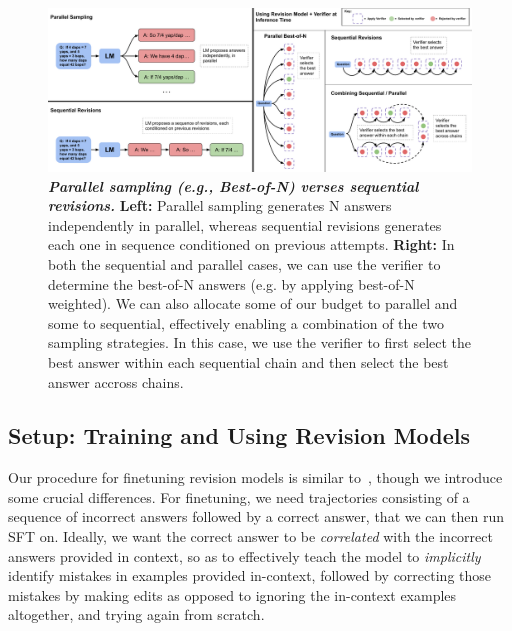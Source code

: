 \begin{figure}
    \centering
    \includegraphics[width=0.99\linewidth]{figures/Revisions_descriptive_fig.pdf}
    \vspace{-0.3cm}
    \caption{\footnotesize{\textbf{\emph{Parallel sampling (e.g., Best-of-N) verses sequential revisions.}} \textbf{Left:} Parallel sampling generates N answers independently in parallel, whereas sequential revisions generates each one in sequence conditioned on previous attempts. \textbf{Right:} In both the sequential and parallel cases, we can use the verifier to determine the best-of-N answers (e.g. by applying best-of-N weighted). We can also allocate some of our budget to parallel and some to sequential, effectively enabling a combination of the two sampling strategies. In this case, we use the verifier to first select the best answer within each sequential chain and then select the best answer accross chains.}}
    \label{fig:how_revisions_works}
    \vspace{-0.3cm}
\end{figure}

\vspace{-0.3cm}
\subsection{Setup: Training and Using Revision Models}
\label{sec:revision_setup}
\vspace{-0.2cm}
Our procedure for finetuning revision models is similar to~\citep{qu2024recursive}, though we introduce some crucial differences.
For finetuning, we need trajectories consisting of a sequence of incorrect answers followed by a correct answer, that we can then run SFT on. Ideally, we want the correct answer to be \emph{correlated} with the incorrect answers provided in context, so as to effectively teach the model to \emph{implicitly} identify mistakes in examples provided in-context, followed by correcting those mistakes by making edits as opposed to ignoring the in-context examples altogether, and trying again from scratch.

